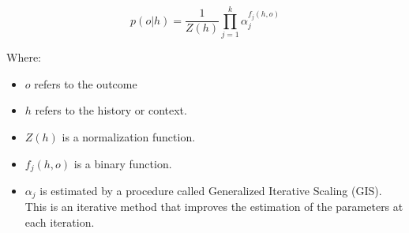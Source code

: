 \begin{equation}
\label{eq:maxent}
p(o|h) = \frac{1}{Z(h)}\prod_{j=1}^k\alpha_j^{f_j(h,o)}
\end{equation}

Where: 
\begin{itemize}
\item $o$ refers to the outcome
\item $h$ refers to the history or context.
\item $Z(h)$ is a normalization function.
\item $f_j(h,o)$ is a binary function.
\item $\alpha_j$ is estimated by a procedure called Generalized Iterative Scaling (GIS). This is an iterative method that improves the estimation of the parameters at each iteration.
\end{itemize}